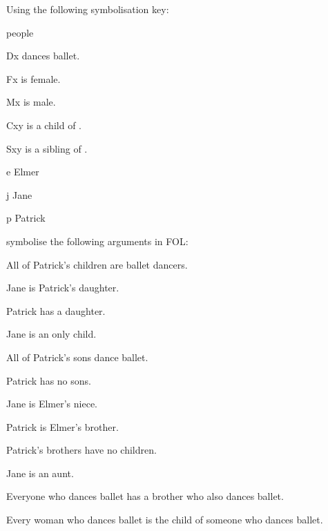 \solutions
\problempart
\label{pr.FOLballet}
Using the following symbolisation key:
\begin{ekey}
\item[\text{domain}] people
\item[Dx]  dances ballet.
\item[Fx]  is female.
\item[Mx]  is male.
\item[Cxy]  is a child of .
\item[Sxy]  is a sibling of .
\item[e] Elmer
\item[j] Jane
\item[p] Patrick
\end{ekey}
symbolise the following arguments in FOL:
\begin{earg}
\item All of Patrick's children are ballet dancers.
\item[] 
\item Jane is Patrick's daughter.
\item[] 
\item Patrick has a daughter.
\item[] 
\item Jane is an only child.
\item[] 
\item All of Patrick's sons dance ballet.
\item[] 
\item Patrick has no sons.
\item[] 
\item Jane is Elmer's niece.
\item[] 
\item Patrick is Elmer's brother.
\item[] 
\item Patrick's brothers have no children.
\item[] 
\item Jane is an aunt.
\item[] 
\item Everyone who dances ballet has a brother who also dances ballet.
\item[] 
\item Every woman who dances ballet is the child of someone who dances ballet.
\item[] 
\end{earg}


